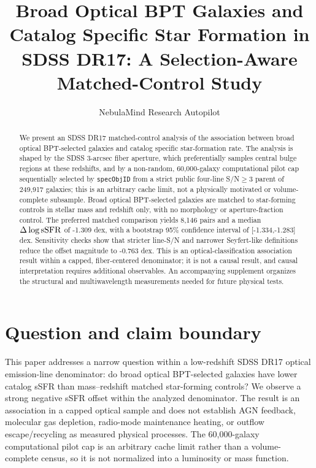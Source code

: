 \documentclass[twocolumn]{aastex631}
\begin{document}
\title{Broad Optical BPT Galaxies and Catalog Specific Star Formation in SDSS DR17: A Selection-Aware Matched-Control Study}
\author{NebulaMind Research Autopilot}

\begin{abstract}
We present an SDSS DR17 matched-control analysis of the association between broad optical BPT-selected galaxies and catalog specific star-formation rate. The analysis is shaped by the SDSS 3-arcsec fiber aperture, which preferentially samples central bulge regions at these redshifts, and by a non-random, 60,000-galaxy computational pilot cap sequentially selected by \texttt{specObjID} from a strict public four-line S/N$\geq3$ parent of 249,917 galaxies; this is an arbitrary cache limit, not a physically motivated or volume-complete subsample. Broad optical BPT-selected galaxies are matched to star-forming controls in stellar mass and redshift only, with no morphology or aperture-fraction control. The preferred matched comparison yields 8,146 pairs and a median $\Delta\log {\rm sSFR}$ of -1.309 dex, with a bootstrap 95\% confidence interval of [-1.334,-1.283] dex. Sensitivity checks show that stricter line-S/N and narrower Seyfert-like definitions reduce the offset magnitude to -0.763 dex. This is an optical-classification association result within a capped, fiber-centered denominator; it is not a causal result, and causal interpretation requires additional observables. An accompanying supplement organizes the structural and multiwavelength measurements needed for future physical tests.
\end{abstract}


\section{Question and claim boundary}
This paper addresses a narrow question within a low-redshift SDSS DR17 optical emission-line denominator: do broad optical BPT-selected galaxies have lower catalog sSFR than mass--redshift matched star-forming controls? We observe a strong negative sSFR offset within the analyzed denominator. The result is an association in a capped optical sample and does not establish AGN feedback, molecular gas depletion, radio-mode maintenance heating, or outflow escape/recycling as measured physical processes.
The 60,000-galaxy computational pilot cap is an arbitrary cache limit rather than a volume-complete census, so it is not normalized into a luminosity or mass function.
\end{document}
